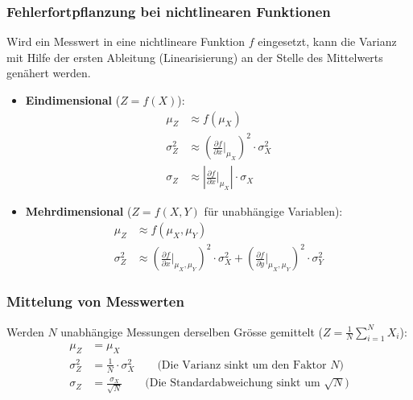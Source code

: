     \subsubsection{Fehlerfortpflanzung bei nichtlinearen Funktionen}
        Wird ein Messwert in eine nichtlineare Funktion $f$ eingesetzt, kann die Varianz mit Hilfe der ersten Ableitung (Linearisierung) an der Stelle des Mittelwerts genähert werden.
        \begin{itemize}
            \item \textbf{Eindimensional} ($Z = f(X)$):
            \begin{align*}
                \mu_Z &\approx f(\mu_X) \\
                \sigma_Z^2 &\approx \left(\frac{\partial f}{\partial x}\bigg|_{\mu_X}\right)^2 \cdot \sigma_X^2 \\
                \sigma_Z &\approx \left|\frac{\partial f}{\partial x}\bigg|_{\mu_X}\right| \cdot \sigma_X
            \end{align*}
            \item \textbf{Mehrdimensional} ($Z = f(X,Y)$ für unabhängige Variablen):
            \begin{align*}
                \mu_Z &\approx f(\mu_X, \mu_Y) \\
                \sigma_Z^2 &\approx \left(\frac{\partial f}{\partial x}\bigg|_{\mu_X, \mu_Y}\right)^2 \cdot \sigma_X^2 + \left(\frac{\partial f}{\partial y}\bigg|_{\mu_X, \mu_Y}\right)^2 \cdot \sigma_Y^2
            \end{align*}
        \end{itemize}

    \subsubsection{Mittelung von Messwerten}
        Werden $N$ unabhängige Messungen derselben Grösse gemittelt ($Z = \frac{1}{N}\sum_{i=1}^{N} X_i$):
        \begin{align*}
            \mu_Z &= \mu_X \\
            \sigma_Z^2 &= \frac{1}{N} \cdot \sigma_X^2 \qquad \text{(Die Varianz sinkt um den Faktor } N \text{)} \\
            \sigma_Z &= \frac{\sigma_X}{\sqrt{N}} \qquad \text{(Die Standardabweichung sinkt um } \sqrt{N} \text{)}
        \end{align*}

